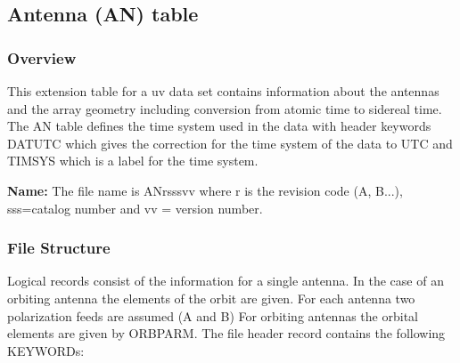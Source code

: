 \subsection{Antenna (AN) table}

\subsubsection{Overview}

This extension table for a uv data set contains information
about the antennas and the array geometry including conversion from
atomic time to sidereal time.  The AN table defines the time system
used in the data with header keywords DATUTC which gives the
correction for the  time system of the data to UTC and TIMSYS which is
a label for the time system.

{\bf Name: }The file name is ANrsssvv where r is the revision code (A,
B...), sss=catalog number and vv = version number.

\subsubsection{File Structure}

     Logical records consist of the information for a single antenna.
In the case of an orbiting antenna the elements of the orbit are given.
For each antenna two polarization feeds are assumed (A and B)
For orbiting antennas the orbital elements are given by ORBPARM.
The file header record contains the following KEYWORDs:

